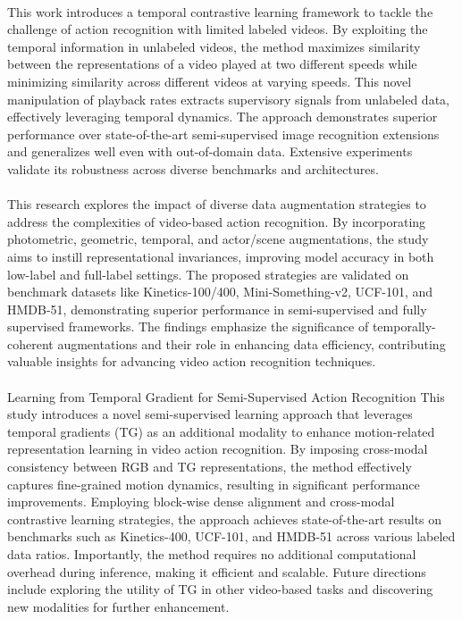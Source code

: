 \documentclass[11pt,a4paper]{report}
\begin{document}
\paragraph{}
This work \cite{Singh2021SemiSupervisedAR} introduces a temporal contrastive learning framework to tackle the challenge of action recognition with limited labeled videos. By exploiting the temporal information in unlabeled videos, the method maximizes similarity between the representations of a video played at two different speeds while minimizing similarity across different videos at varying speeds. This novel manipulation of playback rates extracts supervisory signals from unlabeled data, effectively leveraging temporal dynamics. The approach demonstrates superior performance over state-of-the-art semi-supervised image recognition extensions and generalizes well even with out-of-domain data. Extensive experiments validate its robustness across diverse benchmarks and architectures.

\paragraph{} 
This research \cite{Zou2021LearningRI} explores the impact of diverse data augmentation strategies to address the complexities of video-based action recognition. By incorporating photometric, geometric, temporal, and actor/scene augmentations, the study aims to instill representational invariances, improving model accuracy in both low-label and full-label settings. The proposed strategies are validated on benchmark datasets like Kinetics-100/400, Mini-Something-v2, UCF-101, and HMDB-51, demonstrating superior performance in semi-supervised and fully supervised frameworks. The findings emphasize the significance of temporally-coherent augmentations and their role in enhancing data efficiency, contributing valuable insights for advancing video action recognition techniques.

\paragraph{} Learning from Temporal Gradient for Semi-Supervised Action Recognition
This study \cite{Xiao2021LearningFT} introduces a novel semi-supervised learning approach that leverages temporal gradients (TG) as an additional modality to enhance motion-related representation learning in video action recognition. By imposing cross-modal consistency between RGB and TG representations, the method effectively captures fine-grained motion dynamics, resulting in significant performance improvements. Employing block-wise dense alignment and cross-modal contrastive learning strategies, the approach achieves state-of-the-art results on benchmarks such as Kinetics-400, UCF-101, and HMDB-51 across various labeled data ratios. Importantly, the method requires no additional computational overhead during inference, making it efficient and scalable. Future directions include exploring the utility of TG in other video-based tasks and discovering new modalities for further enhancement.
\end{document}
